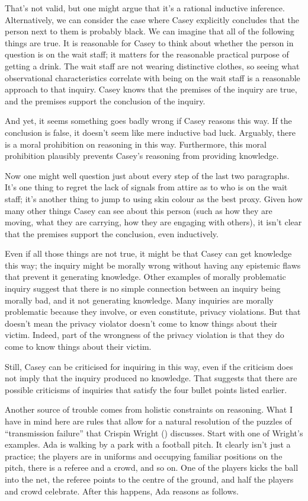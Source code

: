 \documentclass[
  10pt,
  letterpaper,
  twoside]{scrbook}
\begin{document}
That's not valid, but one might argue that it's a rational inductive
inference. Alternatively, we can consider the case where Casey
explicitly concludes that the person next to them is probably black. We
can imagine that all of the following things are true. It is reasonable
for Casey to think about whether the person in question is on the wait
staff; it matters for the reasonable practical purpose of getting a
drink. The wait staff are not wearing distinctive clothes, so seeing
what observational characteristics correlate with being on the wait
staff is a reasonable approach to that inquiry. Casey knows that the
premises of the inquiry are true, and the premises support the
conclusion of the inquiry.

And yet, it seems something goes badly wrong if Casey reasons this way.
If the conclusion is false, it doesn't seem like mere inductive bad
luck. Arguably, there is a moral prohibition on reasoning in this way.
Furthermore, this moral prohibition plausibly prevents Casey's reasoning
from providing knowledge.

Now one might well question just about every step of the last two
paragraphs. It's one thing to regret the lack of signals from attire as
to who is on the wait staff; it's another thing to jump to using skin
colour as the best proxy. Given how many other things Casey can see
about this person (such as how they are moving, what they are carrying,
how they are engaging with others), it isn't clear that the premises
support the conclusion, even inductively.

Even if all those things are not true, it might be that Casey can get
knowledge this way; the inquiry might be morally wrong without having
any epistemic flaws that prevent it generating knowledge. Other examples
of morally problematic inquiry suggest that there is no simple
connection between an inquiry being morally bad, and it not generating
knowledge. Many inquiries are morally problematic because they involve,
or even constitute, privacy violations. But that doesn't mean the
privacy violator doesn't come to know things about their victim. Indeed,
part of the wrongness of the privacy violation is that they do come to
know things about their victim.

Still, Casey can be criticised for inquiring in this way, even if the
criticism does not imply that the inquiry produced no knowledge. That
suggests that there are possible criticisms of inquiries that satisfy
the four bullet points listed earlier.

Another source of trouble comes from holistic constraints on reasoning.
What I have in mind here are rules that allow for a natural resolution
of the puzzles of ``transmission failure'' that Crispin Wright
() discusses. Start with one of Wright's
examples. Ada is walking by a park with a football pitch. It clearly
isn't just a practice; the players are in uniforms and occupying
familiar positions on the pitch, there is a referee and a crowd, and so
on. One of the players kicks the ball into the net, the referee points
to the centre of the ground, and half the players and crowd celebrate.
After this happens, Ada reasons as follows.
\end{document}
